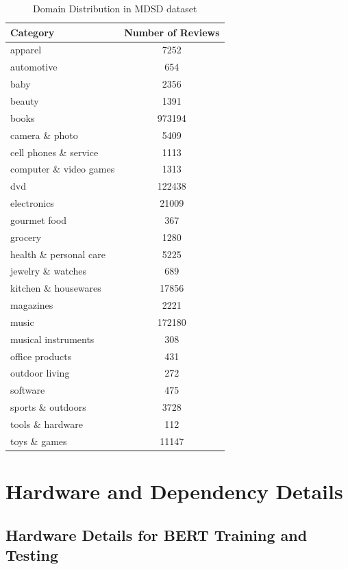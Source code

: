 \documentclass{csfourzero}
\begin{document}
\begin{table}[H]
    \centering
    \begin{tabular}[t]{lc}
        \hline
        Category & Number of Reviews \\
        \hline
        apparel & 	7252 \\
        automotive & 	654 \\
        baby & 	2356 \\
        beauty & 	1391 \\
        books & 	973194 \\
        camera \& photo & 	5409 \\
        cell phones \& service &  1113 \\
        computer \& video games & 	1313 \\
        dvd & 	122438 \\
        electronics & 	21009 \\
        gourmet food & 	367 \\
        grocery & 	1280 \\
        health \& personal care & 	5225 \\
        jewelry \& watches & 	689 \\
        kitchen \& housewares & 	17856 \\
        magazines & 	2221 \\
        music & 	172180 \\
        musical instruments & 	308 \\
        office products &	431 \\
        outdoor living & 	272 \\
        software & 475 \\
        sports \& outdoors & 	3728 \\
        tools \& hardware & 	112 \\
        toys \& games & 	11147 \\
        \hline
    \end{tabular}
    \caption{Domain Distribution in MDSD dataset \cite{sentibench}}
    \label{tab:vaderPerf}
\end{table}

\newpage

\section{Hardware and Dependency Details}
\label{appendix:B}

\subsection{Hardware Details for BERT Training and Testing}
\end{document}
